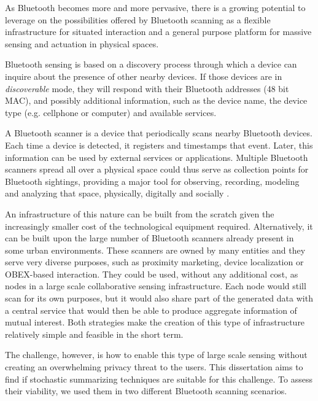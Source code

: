 As Bluetooth becomes more and more pervasive, there is a growing
potential to leverage on the possibilities offered by Bluetooth
scanning as a flexible infrastructure for situated interaction and a
general purpose platform for massive sensing and actuation in physical
spaces.

Bluetooth sensing is based on a discovery process through
which a device can inquire about the presence of other nearby devices.
If those devices are in \emph{discoverable} mode, they will respond
with their Bluetooth addresses (48 bit MAC), and possibly additional
information, such as the device name, the device type (e.g. cellphone
or computer) and available services.

A Bluetooth scanner is a device that periodically scans nearby
Bluetooth devices. Each time a device is detected, it registers and
timestamps that event. Later, this information can be used by external
services or applications. Multiple Bluetooth scanners spread all over
a physical space could thus serve as collection points for Bluetooth
sightings, providing a major tool for observing, recording, modeling
and analyzing that space, physically, digitally and socially
\cite{Oneill:2006vq}.

An infrastructure of this nature can be built from the scratch given
the increasingly smaller cost of the technological equipment required.
Alternatively, it can be built upon the large number of Bluetooth
scanners already present in some urban environments. These scanners
are owned by many entities and they serve very diverse purposes, such
as proximity marketing, device localization or OBEX-based interaction.
They could be used, without any additional cost, as nodes in a large
scale collaborative sensing infrastructure. Each node would still scan
for its own purposes, but it would also share part of the generated
data with a central service that would then be able to produce
aggregate information of mutual interest. Both strategies make the
creation of this type of infrastructure relatively simple and feasible
in the short term.

The challenge, however, is how to enable this type of large scale
sensing without creating an overwhelming privacy threat to the users.
This dissertation aims to find if stochastic summarizing techniques
are suitable for this challenge. To assess their viability, we used
them in two different Bluetooth scanning scenarios.


